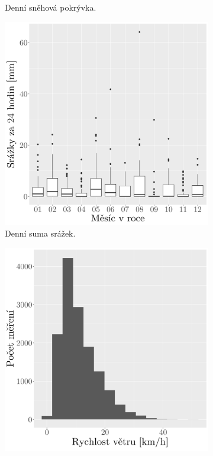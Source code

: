 \begin{figure}
\begin{subfigure}{0.45\textwidth}
		\caption{Denní sněhová pokrývka.}
		\label{fig:synop_snowcm}
	\end{subfigure}
	\hfill
	\begin{subfigure}{0.45\textwidth}
  \includegraphics[width=\textwidth]{img/ch2/hist_prec_synop_bymonth.png}
		\caption{Denní suma srážek.}
		\label{fig:synop_prec}
	\end{subfigure}
	\hfill
	\begin{subfigure}{0.45\textwidth}
  \includegraphics[width=\textwidth]{img/ch2/hist_wind_synop_bymonth.png}

\end{subfigure}
\end{figure}
